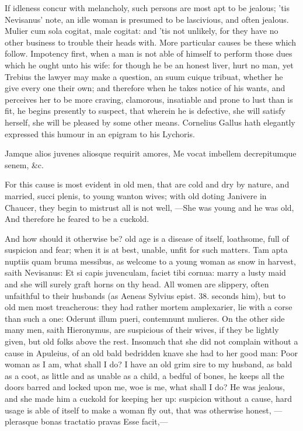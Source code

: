 {If idleness concur with melancholy, such persons are most apt to be
jealous; 'tis Nevisanus' note, an idle woman is presumed to be
lascivious, and often jealous. Mulier cum sola cogitat, male cogitat:
and 'tis not unlikely, for they have no other business to trouble their
heads with.
More particular causes be these which follow. Impotency first, when a
man is not able of himself to perform those dues which he ought unto
his wife: for though he be an honest liver, hurt no man, yet Trebius
the lawyer may make a question, an suum cuique tribuat, whether he give
every one their own; and therefore when he takes notice of his wants,
and perceives her to be more craving, clamorous, insatiable and prone
to lust than is fit, he begins presently to suspect, that wherein he is
defective, she will satisfy herself, she will be pleased by some other
means. Cornelius Gallus hath elegantly expressed this humour in an
epigram to his Lychoris.

Jamque alios juvenes aliosque requirit amores,
Me vocat imbellem decrepitumque senem, \&c.

For this cause is most evident in old men, that are cold and dry by
nature, and married, succi plenis, to young wanton wives; with old
doting Janivere in Chaucer, they begin to mistrust all is not well,
---She was young and he was old,
And therefore he feared to be a cuckold.

And how should it otherwise be? old age is a disease of itself,
loathsome, full of suspicion and fear; when it is at best, unable,
unfit for such matters. Tam apta nuptiis quam bruma messibus, as
welcome to a young woman as snow in harvest, saith Nevisanus: Et si
capis juvenculam, faciet tibi cornua: marry a lusty maid and she will
surely graft horns on thy head. All women are slippery, often
unfaithful to their husbands (as Aeneas Sylvius epist. 38. seconds
him), but to old men most treacherous: they had rather mortem
amplexarier, lie with a corse than such a one: Oderunt illum
pueri, contemnunt mulieres. On the other side many men, saith
Hieronymus, are suspicious of their wives, if they be lightly
given, but old folks above the rest. Insomuch that she did not complain
without a cause in Apuleius, of an old bald bedridden knave she
had to her good man: Poor woman as I am, what shall I do? I have an old
grim sire to my husband, as bald as a coot, as little and as unable as
a child, a bedful of bones, he keeps all the doors barred and locked
upon me, woe is me, what shall I do? He was jealous, and she made him a
cuckold for keeping her up: suspicion without a cause, hard usage is
able of itself to make a woman fly out, that was otherwise honest,
---plerasque bonas tractatio pravas
Esse facit,---

}
